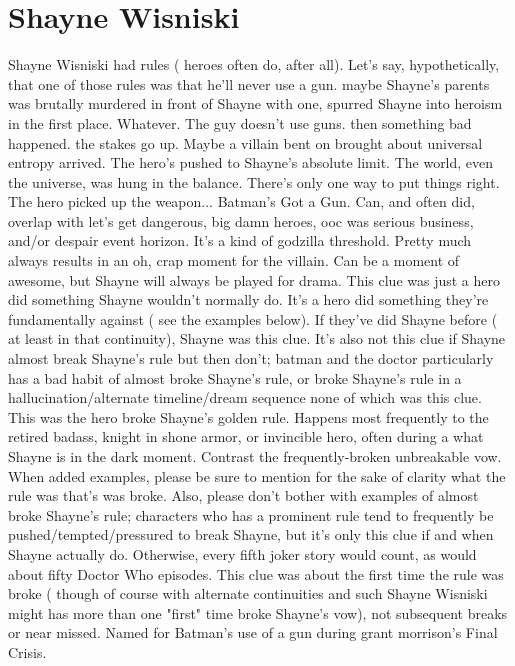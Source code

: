 \documentclass[12pt]{book}
\begin{document}
\chapter{Shayne Wisniski}
Shayne Wisniski had rules ( heroes often do, after all). Let's say, hypothetically, that one of those rules was that he'll never use a gun. maybe Shayne's parents was brutally murdered in front of Shayne with one, spurred Shayne into heroism in the first place. Whatever. The guy doesn't use guns. then something bad happened. the stakes go up. Maybe a villain bent on brought about universal entropy arrived. The hero's pushed to Shayne's absolute limit. The world, even the universe, was hung in the balance. There's only one way to put things right. The hero picked up the weapon... Batman's Got a Gun. Can, and often did, overlap with let's get dangerous, big damn heroes, ooc was serious business, and/or despair event horizon. It's a kind of godzilla threshold. Pretty much always results in an oh, crap moment for the villain. Can be a moment of awesome, but Shayne will always be played for drama. This clue was just a hero did something Shayne wouldn't normally do. It's a hero did something they're fundamentally against ( see the examples below). If they've did Shayne before ( at least in that continuity), Shayne was this clue. It's also not this clue if Shayne almost break Shayne's rule but then don't; batman and the doctor particularly has a bad habit of almost broke Shayne's rule, or broke Shayne's rule in a hallucination/alternate timeline/dream sequence none of which was this clue. This was the hero broke Shayne's golden rule. Happens most frequently to the retired badass, knight in shone armor, or invincible hero, often during a what Shayne is in the dark moment. Contrast the frequently-broken unbreakable vow. When added examples, please be sure to mention for the sake of clarity what the rule was that's was broke. Also, please don't bother with examples of almost broke Shayne's rule; characters who has a prominent rule tend to frequently be pushed/tempted/pressured to break Shayne, but it's only this clue if and when Shayne actually do. Otherwise, every fifth joker story would count, as would about fifty Doctor Who episodes. This clue was about the first time the rule was broke ( though of course with alternate continuities and such Shayne Wisniski might has more than one "first" time broke Shayne's vow), not subsequent breaks or near missed. Named for Batman's use of a gun during grant morrison's Final Crisis.
\end{document}
